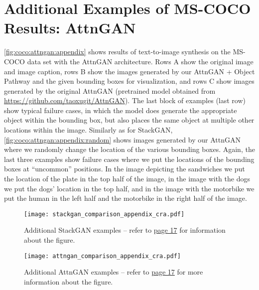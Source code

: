\documentclass{article} \usepackage{iclr2019_conference,times}
\newif\ifappendix
\begin{document}
	\section{Additional Examples of MS-COCO Results: AttnGAN}
	\label{app:fig:mscoco:attngan}
	\vspace{-1em}
	\autoref{fig:coco:attngan:appendix} shows results of text-to-image synthesis on the MS-COCO data set with the AttnGAN architecture.
	Rows A show the original image and image caption, rows B show the images generated by our AttnGAN + Object Pathway and the given bounding boxes for visualization, and rows C show images generated by the original AttnGAN (pretrained model obtained from \url{https://github.com/taoxugit/AttnGAN}).
	The last block of examples (last row) show typical failure cases, in which the model does generate the appropriate object within the bounding box, but also places the same object at multiple other locations within the image.
Similarly as for StackGAN, \autoref{fig:coco:attngan:appendix:random} shows images generated by our AttnGAN where we randomly change the location of the various bounding boxes.
	Again, the last three examples show failure cases where we put the locations of the bounding boxes at ``uncommon'' positions. In the image depicting the sandwiches we put the location of the plate in the top half of the image, in the image with the dogs we put the dogs' location in the top half, and in the image with the motorbike we put the human in the left half and the motorbike in the right half of the image.
		
	\ifappendix
	\newpage
	
	\begin{figure}[h]
		\centering
		\texttt{[image: stackgan\_comparison\_appendix\_cra.pdf]}
		\caption{Additional StackGAN examples -- refer to \hyperref[app:fig:mscoco:stackgan]{page 17} for information about the figure.}
		\label{fig:coco:stackgan:appendix}
		\vspace{-0.75em}
	\end{figure}
	
	\newpage	
	\begin{figure}[h]
		\centering
		\texttt{[image: attngan\_comparison\_appendix\_cra.pdf]}
		\caption{Additional AttnGAN examples -- refer to \hyperref[app:fig:mscoco:attngan]{page 17} for more information about the figure.}
		\label{fig:coco:attngan:appendix}
		\vspace{-0.75em}
	\end{figure}	
	
\end{document}
